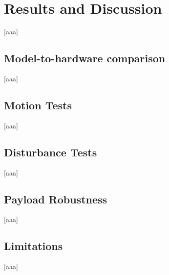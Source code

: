 \chapter{Results and Discussion} \label{sec:Results and Discussion}
    [aaa]

\section{Model-to-hardware comparison} \label{sec:Model-to-hardware comparison}
    [aaa]

\section{Motion Tests} \label{sec:Motion Tests}
    [aaa]

\section{Disturbance Tests} \label{sec:Disturbance Tests}
    [aaa]

\section{Payload Robustness} \label{sec:Payload Robustness}
    [aaa]

\section{Limitations} \label{sec:Limitations}
    [aaa]
